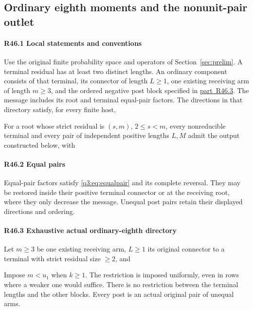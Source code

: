 \subsection{Ordinary eighth moments and the nonunit-pair outlet}\label{proof:R2-C046}
\paragraph{R46.1 Local statements and conventions}
Use the original finite probability space and operators of
Section~\ref{sec:prelim}. A terminal residual has at least two distinct
lengths. An ordinary component consists of that terminal, its connector
of length \(L\ge1\), one existing receiving arm of length \(m\ge3\),
and the ordered negative post block specified in
\mbox{\hyperref[part:R46.3]{part R46.3}}. The message includes its
root and terminal equal-pair factors. The directions in that directory
satisfy, for every finite host,

For a root whose strict residual is \((s,m)\), \(2\le s<m\), every
nonreducible terminal and every pair of independent positive lengths
\(L,M\) admit the output constructed below, with

\paragraph{R46.2 Equal pairs}
Equal-pair factors satisfy \eqref{q3:eq:equalpair} and its complete
reversal. They may be restored inside their positive terminal connector
or at the receiving root, where they only decrease the message.
Unequal post pairs retain their displayed directions and ordering.


\paragraph{R46.3 Exhaustive actual ordinary-eighth directory}\label{part:R46.3}

Let \(m\ge 3\) be one existing receiving arm, \(L\ge 1\) its original connector
to a terminal with strict residual size \(\ge2\), and


Impose \(m<u_{1}\) when \(k\ge 1.\) The restriction is imposed uniformly, even in rows where a weaker one would suffice. There
is no restriction between the terminal lengths and the other blocks.
Every post is an actual original pair of unequal arms.

